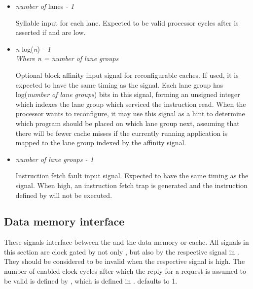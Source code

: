 \documentclass[main.tex]{subfiles}
\begin{document}
\begin{itemize}
  \vspace{1em}
  \item {}\textit{number of} lanes \textit{- 1}
  
  Syllable input for each lane. Expected to be valid  processor cycles after  is asserted if  and  are low.
  
  \vspace{1em}
  \item {}\textit{n} log(\textit{n}) \textit{- 1}\\
  \textit{Where n = number of lane groups}
  
  Optional block affinity input signal for reconfigurable caches. If used, it is expected to have the same timing as the  signal. Each lane group has log(\textit{number of lane groups}) bits in this signal, forming an unsigned integer which indexes the lane group which serviced the instruction read. When the processor wants to reconfigure, it may use this signal as a hint to determine which program should be placed on which lane group next, assuming that there will be fewer cache misses if the currently running application is mapped to the lane group indexed by the affinity signal.
  
  \vspace{1em}
  \item {}\textit{number of lane groups - 1}
  
  Instruction fetch fault input signal. Expected to have the same timing as the  signal. When high, an instruction fetch trap is generated and the instruction defined by  will not be executed.
  
\end{itemize}

\subsection{Data memory interface}

These signals interface between the \rvex{} and the data memory or cache. All signals in this section are clock gated by not only , but also by the respective signal in . They should be considered to be invalid when the respective  signal is high. The number of enabled clock cycles after which the reply for a request is assumed to be valid is defined by , which is defined in .  defaults to 1.
\end{document}
